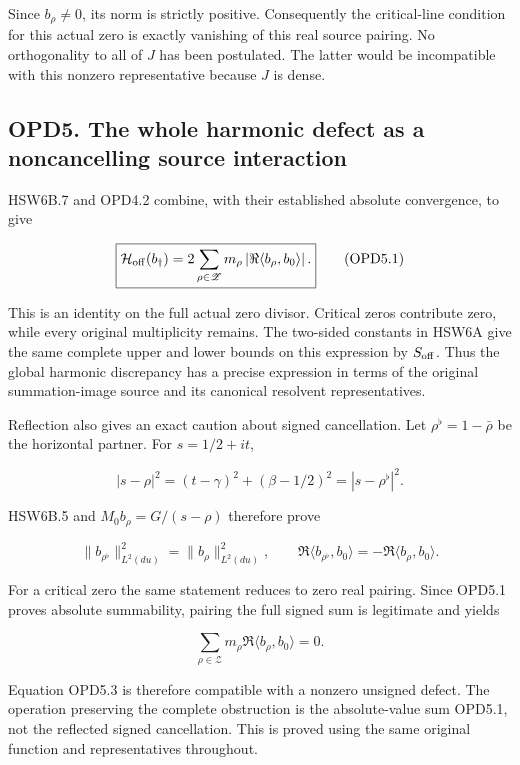 Since \(b_\rho\ne0\), its norm is strictly positive. Consequently the
critical-line condition for this actual zero is exactly vanishing of
this real source pairing. No orthogonality to all of \(J\) has been
postulated. The latter would be incompatible with this nonzero
representative because \(J\) is dense.

\subsection{OPD5. The whole harmonic defect as a noncancelling source
interaction}\label{opd5.-the-whole-harmonic-defect-as-a-noncancelling-source-interaction}

HSW6B.7 and OPD4.2 combine, with their established absolute convergence,
to give

\[
\boxed{
\mathcal H_{\rm off}(b_\dagger)
=2\sum_{\rho\in\mathscr Z}m_\rho
 \left|\Re\langle b_\rho,b_0\rangle\right|.}
\tag{OPD5.1}
\]

This is an identity on the full actual zero divisor. Critical zeros
contribute zero, while every original multiplicity remains. The
two-sided constants in HSW6A give the same complete upper and lower
bounds on this expression by \(S_{\rm off}\). Thus the global harmonic
discrepancy has a precise expression in terms of the original
summation-image source and its canonical resolvent representatives.

Reflection also gives an exact caution about signed cancellation. Let
\(\rho^\flat=1-\bar\rho\) be the horizontal partner. For \(s=1/2+it\),

\[
|s-\rho|^2=(t-\gamma)^2+(\beta-1/2)^2
=|s-\rho^\flat|^2.
\]

HSW6B.5 and \(M_0b_\rho=G/(s-\rho)\) therefore prove

\[
\|b_{\rho^\flat}\|_{L^2(du)}^2=\|b_\rho\|_{L^2(du)}^2,
\qquad
\Re\langle b_{\rho^\flat},b_0\rangle
=-\Re\langle b_\rho,b_0\rangle.
\tag{OPD5.2}
\]

For a critical zero the same statement reduces to zero real pairing.
Since OPD5.1 proves absolute summability, pairing the full signed sum is
legitimate and yields

\[
\sum_{\rho\in\mathscr Z}m_\rho\Re\langle b_\rho,b_0\rangle=0.
\tag{OPD5.3}
\]

Equation OPD5.3 is therefore compatible with a nonzero unsigned defect.
The operation preserving the complete obstruction is the absolute-value
sum OPD5.1, not the reflected signed cancellation. This is proved using
the same original function and representatives throughout.

